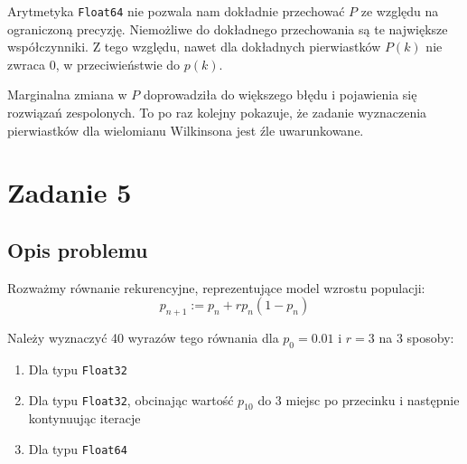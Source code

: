 \documentclass{article}
\begin{document}
Arytmetyka \texttt{Float64} nie pozwala nam dokładnie przechować $P$ ze względu na ograniczoną precyzję. Niemożliwe do
dokładnego przechowania są te największe współczynniki. Z tego względu, nawet dla dokładnych pierwiastków $P(k)$ nie
zwraca 0, w przeciwieństwie do $p(k)$.

Marginalna zmiana w $P$ doprowadziła do większego błędu i pojawienia się rozwiązań zespolonych. To po raz kolejny
pokazuje, że zadanie wyznaczenia pierwiastków dla wielomianu Wilkinsona jest źle uwarunkowane.

\section{Zadanie 5}
\subsection{Opis problemu}
Rozważmy równanie rekurencyjne, reprezentujące model wzrostu populacji:
$$p_{n+1} := p_n + rp_n(1 - p_n)$$

\noindent Należy wyznaczyć 40 wyrazów tego równania dla $p_0 = 0.01$ i $r = 3$ na 3 sposoby:
\begin{enumerate}
    \item Dla typu \texttt{Float32}
    \item Dla typu \texttt{Float32}, obcinając wartość $p_{10}$ do 3 miejsc po przecinku i następnie kontynuując iteracje
    \item Dla typu \texttt{Float64}
\end{enumerate}
\end{document}
